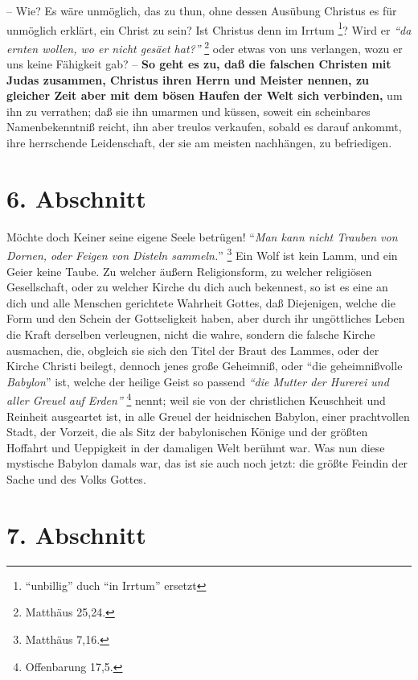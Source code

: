 -- Wie? Es wäre unmöglich, das zu thun, ohne dessen Ausübung Christus es für
unmöglich erklärt, ein Christ zu sein? Ist Christus denn im Irrtum
\footnote{"`unbillig"' duch "`in Irrtum"' ersetzt}? Wird er
\textit{"`da ernten wollen, wo er nicht gesäet hat?"'}
\footnote{Matthäus 25,24.}
oder etwas von uns verlangen, wozu er uns
keine Fähigkeit gab?
-- \textbf{So geht es zu, daß die falschen Christen mit Judas zusammen, Christus ihren
Herrn und Meister nennen, zu gleicher Zeit aber mit dem bösen Haufen der Welt
sich verbinden,} um ihn zu verrathen;
daß sie ihn umarmen und küssen, soweit ein scheinbares Namenbekenntniß
 reicht, ihn aber treulos verkaufen, sobald es darauf
ankommt, ihre herrschende Leidenschaft, der sie am meisten nachhängen, zu
befriedigen.

\section{6. Abschnitt} \label{kap1_ab6}

Möchte doch Keiner seine eigene Seele betrügen!
"`\textit{Man kann nicht Trauben von Dornen, oder Feigen von Disteln sammeln.}"'
\footnote{Matthäus 7,16.} 
Ein Wolf ist kein Lamm, und ein Geier keine Taube.
Zu welcher äußern Religionsform, zu welcher religiösen Gesellschaft, oder zu
welcher Kirche du dich auch bekennest, so ist es eine an dich und alle Menschen
gerichtete Wahrheit Gottes, daß Diejenigen, welche die Form und den Schein der
Gottseligkeit haben, aber durch ihr ungöttliches Leben die Kraft derselben
verleugnen, nicht die wahre, sondern die falsche Kirche ausmachen, die, obgleich
sie sich den Titel der Braut des Lammes, oder der Kirche Christi beilegt,
dennoch jenes große Geheimniß, oder "`die geheimnißvolle \textit{Babylon}"'
  ist, welche der heilige
Geist so passend
\textit{"`die Mutter der Hurerei und aller Greuel auf Erden"'}
\footnote{Offenbarung 17,5.}
nennt; weil
sie von der christlichen Keuschheit und Reinheit ausgeartet ist, in alle Greuel
der heidnischen Babylon, einer prachtvollen Stadt, der Vorzeit, die als Sitz der
babylonischen Könige und der größten Hoffahrt und Ueppigkeit in der damaligen
Welt berühmt war. Was nun diese mystische Babylon damals war, das ist sie auch
noch jetzt: die größte Feindin der Sache und des Volks Gottes.

\section{7. Abschnitt} \label{kap1_ab7}

